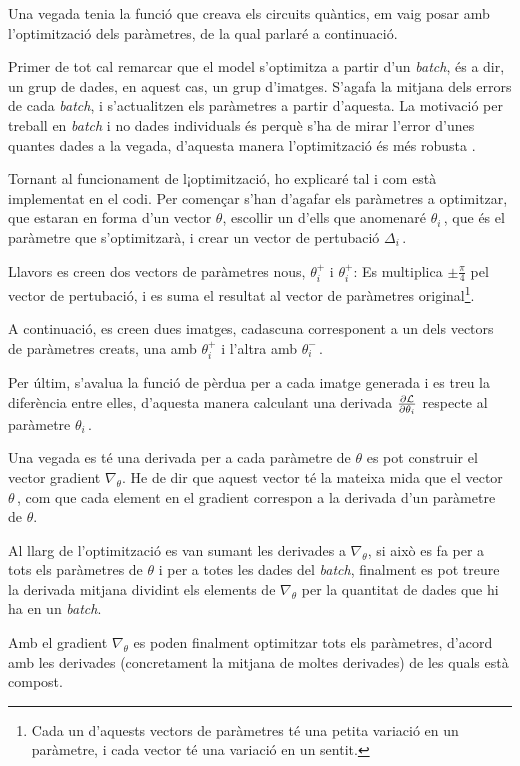 Una vegada tenia la funció que creava els circuits quàntics, em vaig posar amb l'optimització dels paràmetres, de la qual parlaré a continuació.

Primer de tot cal remarcar que el model s'optimitza a partir d'un \textit{batch}, és a dir, un grup de dades, en aquest cas, un grup d'imatges. S'agafa la mitjana dels errors de cada \textit{batch}, i s'actualitzen els paràmetres a partir d'aquesta. La motivació per treball en \textit{batch} i no dades individuals és perquè s'ha de mirar l'error d'unes quantes dades a la vegada, d'aquesta manera l'optimització és més robusta \cite{GAN2014}.

Tornant al funcionament de l¡optimització, ho explicaré tal i com està implementat en el codi. Per començar s'han d'agafar els paràmetres a optimitzar, que estaran en forma d'un vector $\theta$, escollir un d'ells que anomenaré $\theta_{i}\,$, que és el paràmetre que s'optimitzarà, i crear un vector de pertubació $\Delta_{i}\,$. 

Llavors es creen dos vectors de paràmetres nous, $\theta^{+}_{i}$ i $\theta^{+}_{i}$: Es multiplica $\pm\frac{\pi}{4}$ pel vector de pertubació, i es suma el resultat al vector de paràmetres original\footnote{Cada un d'aquests vectors de paràmetres té una petita variació en un paràmetre, i cada vector té una variació en un sentit.}. 

A continuació, es creen dues imatges, cadascuna corresponent a un dels vectors de paràmetres creats, una amb $\theta^{+}_{i}$ i l'altra amb $\theta^{-}_{i}\,$. 

Per últim, s'avalua la funció de pèrdua per a cada imatge generada i es treu la diferència entre elles, d'aquesta manera calculant una derivada $\pdv{\mathcal{L}}{\theta_i}$ respecte al paràmetre $\theta_{i}\,$.

Una vegada es té una derivada per a cada paràmetre de $\theta$ es pot construir el vector gradient $\nabla_\theta$. He de dir que aquest vector té la mateixa mida que el vector $\theta\,$, com que cada element en el gradient correspon a la derivada d'un paràmetre de $\theta$.

Al llarg de l'optimització es van sumant les derivades a $\nabla_\theta$, si això es fa per a tots els paràmetres de $\theta$ i per a totes les dades del \textit{batch}, finalment es pot treure la derivada mitjana dividint els elements de $\nabla_{\theta}$ per la quantitat de dades que hi ha en un \textit{batch}.

Amb el gradient $\nabla_{\theta}$ es poden finalment optimitzar tots els paràmetres, d'acord amb les derivades (concretament la mitjana de moltes derivades) de les quals està compost. 
 

